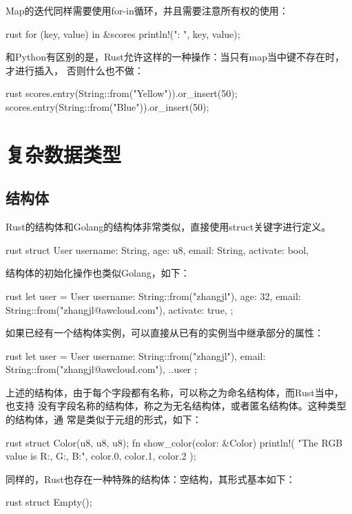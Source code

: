 Map的迭代同样需要使用for-in循环，并且需要注意所有权的使用：
\begin{code-block}{rust}
for (key, value) in &scores {
    println!("{}: {}", key, value);
}
\end{code-block}

和Python有区别的是，Rust允许这样的一种操作：当只有map当中键不存在时，才进行插入，
否则什么也不做：
\begin{code-block}{rust}
scores.entry(String::from("Yellow")).or_insert(50);
scores.entry(String::from("Blue")).or_insert(50);
\end{code-block}

\section{复杂数据类型}
\subsection{结构体}
Rust的结构体和Golang的结构体非常类似，直接使用struct关键字进行定义。
\begin{code-block}{rust}
struct User {
    username: String,
    age: u8,
    email: String,
    activate: bool,
}
\end{code-block}
结构体的初始化操作也类似Golang，如下：
\begin{code-block}{rust}
let user = User {
    username: String::from("zhangjl"),
    age: 32,
    email: String::from("zhangjl@awcloud.com"),
    activate: true,
};
\end{code-block}
如果已经有一个结构体实例，可以直接从已有的实例当中继承部分的属性：
\begin{code-block}{rust}
let user = User {
    username: String::from("zhangjl"),
    email: String::from("zhangjl@awcloud.com"),
    ..user
};
\end{code-block}

上述的结构体，由于每个字段都有名称，可以称之为命名结构体，而Rust当中，也支持
没有字段名称的结构体，称之为无名结构体，或者匿名结构体。这种类型的结构体，通
常是类似于元组的形式，如下：
\begin{code-block}{rust}
struct Color(u8, u8, u8);
fn show_color(color: &Color) {
    println!(
        "The RGB value is R:{}, G:{}, B:{}",
        color.0, color.1, color.2
    );
}
\end{code-block}
同样的，Rust也存在一种特殊的结构体：空结构，其形式基本如下：
\begin{code-block}{rust}
struct Empty();
\end{code-block}

